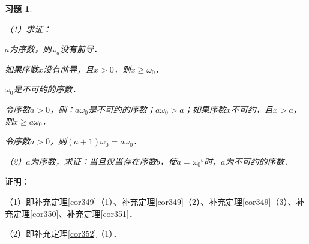 \documentclass[12pt, a4paper, oneside]{book}
\newtheorem{exer}{习题}
\begin{document}
			\begin{exer}\label{exer166}
				\hfill\par
				（1）求证：
				\par
				$a$为序数，则$\omega_a$没有前导．
				\par
				如果序数$x$没有前导，且$x>0$，则$x\geq \omega_0$．
				\par
				$\omega_0$是不可约的序数．
				\par
				令序数$a>0$，则：$a\omega_0$是不可约的序数；$a\omega_0>a$；如果序数$x$不可约，且$x>a$，则$x\geq a\omega_0$．
				\par
				令序数$a>0$，则$(a+1)\omega_0=a\omega_0$．
				\par
				（2）$a$为序数，求证：当且仅当存在序数$b$，使$a={\omega_0}^b$时，$a$为不可约的序数．
			\end{exer}
			证明：
			\par
			（1）即补充定理\ref{cor349}（1）、补充定理\ref{cor349}（2）、补充定理\ref{cor349}（3）、补充定理\ref{cor350}、补充定理\ref{cor351}．
			\par
			（2）即补充定理\ref{cor352}（1）．
			
\end{document}
